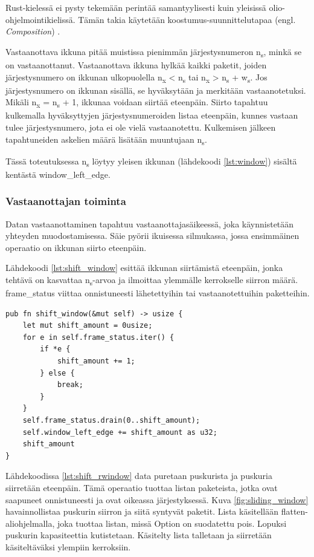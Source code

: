 \documentclass[a4paper,12pt]{article}
\begin{document}
    Rust-kielessä ei pysty tekemään perintää samantyylisesti kuin yleisissä olio-ohjelmointikielissä. Tämän takia
    käytetään koostumus-suunnittelutapaa (engl. \textit{Composition}) \cite{Ivicevic202228Rust}.

    Vastaanottava ikkuna pitää muistissa pienimmän järjestysnumeron n\textsubscript{s}, minkä se on vastaanottanut.
    Vastaanottava ikkuna hylkää kaikki paketit, joiden järjestysnumero on ikkunan ulkopuolella n\textsubscript{x} < n\textsubscript{s} tai n\textsubscript{x} > n\textsubscript{s} + w\textsubscript{s}. Jos järjestysnumero on ikkunan sisällä, se hyväksytään ja merkitään vastaanotetuksi. Mikäli n\textsubscript{x} = n\textsubscript{s} + 1, ikkunaa voidaan siirtää eteenpäin.
    Siirto tapahtuu kulkemalla hyväksyttyjen järjestysnumeroiden listaa eteenpäin, kunnes vastaan tulee järjestysnumero, jota ei ole vielä vastaanotettu. Kulkemisen jälkeen tapahtuneiden askelien määrä lisätään muuntujaan n\textsubscript{s}.

    Tässä toteutuksessa n\textsubscript{s} löytyy yleisen ikkunan (lähdekoodi \ref{lst:window}) sisältä kentästä window\_left\_edge.


    \subsubsection*{Vastaanottajan toiminta}
    Datan vastaanottaminen tapahtuu vastaanottajasäikeessä, joka käynnistetään yhteyden muodostamisessa.
    Säie pyörii ikuisessa silmukassa, jossa ensimmäinen operaatio on ikkunan siirto eteenpäin.

    Lähdekoodi \ref{lst:shift_window} esittää ikkunan siirtämistä eteenpäin, jonka tehtävä on kasvattaa n\textsubscript{s}-arvoa ja ilmoittaa ylemmälle kerrokselle siirron määrä.
    frame\_status viittaa onnistuneesti lähetettyihin tai vastaanotettuihin paketteihin.

    \begin{lstlisting}[caption={Ikkunan siirto}, label={lst:shift_window}]
pub fn shift_window(&mut self) -> usize {
    let mut shift_amount = 0usize;
    for e in self.frame_status.iter() {
        if *e {
            shift_amount += 1;
        } else {
            break;
        }
    }
    self.frame_status.drain(0..shift_amount);
    self.window_left_edge += shift_amount as u32;
    shift_amount
}\end{lstlisting}

    Lähdekoodissa \ref{lst:shift_rwindow} data puretaan puskurista ja puskuria siirretään eteenpäin. Tämä operaatio tuottaa
    listan paketeista, jotka ovat saapuneet onnistuneesti ja ovat oikeassa järjestyksessä. Kuva \ref{fig:sliding_window} havainnollistaa puskurin siirron ja siitä syntyvät paketit.
    Lista käsitellään flatten-aliohjelmalla, joka tuottaa listan, missä Option
    on suodatettu pois. Lopuksi puskurin kapasiteettia kutistetaan. Käsitelty lista talletaan ja siirretään käsiteltäväksi ylempiin kerroksiin. \par
\end{document}
